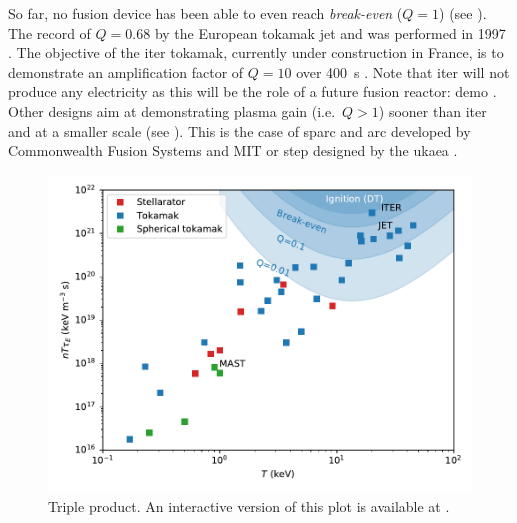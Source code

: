 So far, no fusion device has been able to even reach \textit{break-even} ($Q = 1$) (see ).
The record of $Q = 0.68$ by the European \gls{tokamak} \gls{jet} and was performed in 1997 .
The objective of the \gls{iter} \gls{tokamak}, currently under construction in France, is to demonstrate an amplification factor of $Q=10$ over \SI{400}{s} . 
Note that \acrshort{iter} will not produce any electricity as this will be the role of a future fusion reactor: \gls{demo} .
Other designs aim at demonstrating \gls{plasma} gain (i.e.\ $Q > 1$) sooner than \acrshort{iter} and at a smaller scale (see ).
This is the case of \acrshort{sparc} and \acrshort{arc} developed by Commonwealth Fusion Systems and MIT  or \acrshort{step} designed by the \gls{ukaea} .

\begin{figure}
    \centering
    \includegraphics[width=\linewidth]{Figures/Chapter1/triple_product_vs_T.pdf}
    \caption{Triple product. An interactive version of this plot is available at \cite{delaporte-mathurin_remdelaportemathurinfusion-world_2022}.}
\end{figure}

